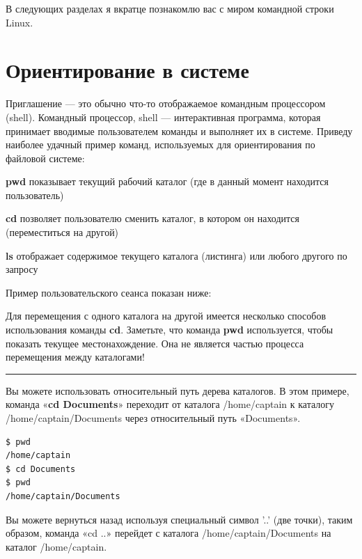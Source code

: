 \documentclass[10pt]{book}
\begin{document}
В следующих разделах я вкратце познакомлю вас с миром командной строки Linux.

\section{Ориентирование в системе}

Приглашение — это обычно что-то отображаемое командным процессором (shell). Командный процессор, shell — интерактивная программа, которая принимает вводимые пользователем команды и выполняет их в системе. Приведу наиболее удачный пример команд, используемых для ориентирования по файловой системе:

\begin{description}
	\item \textbf{pwd} показывает текущий рабочий каталог (где в данный момент находится пользователь)
	\item \textbf{cd} позволяет пользователю сменить каталог, в котором он находится (переместиться на другой)
	\item \textbf{ls} отображает содержимое текущего каталога (листинга) или любого другого по запросу
\end{description}

Пример пользовательского сеанса показан ниже:

\vspace{3mm}


Для перемещения с одного каталога на другой имеется несколько способов использования команды \textbf{cd}. Заметьте, что команда \textbf{pwd} используется, чтобы показать текущее местонахождение. Она не является частью процесса перемещения между каталогами!

\phantom{}
\hrule{}
\phantom{}

Вы можете использовать относительный путь дерева каталогов. В этом примере, команда «\textbf{cd Documents}» переходит от каталога /home/captain к каталогу /home/captain/Documents через относительный путь «Documents».

\vspace{3mm}
\begin{tcolorbox}
\begin{lstlisting}
$ pwd
/home/captain
$ cd Documents
$ pwd
/home/captain/Documents
\end{lstlisting}
\end{tcolorbox}

Вы можете вернуться назад используя специальный символ '..' (две точки), таким образом, команда «cd ..» перейдет с каталога /home/captain/Documents на  каталог /home/captain.
\end{document}

